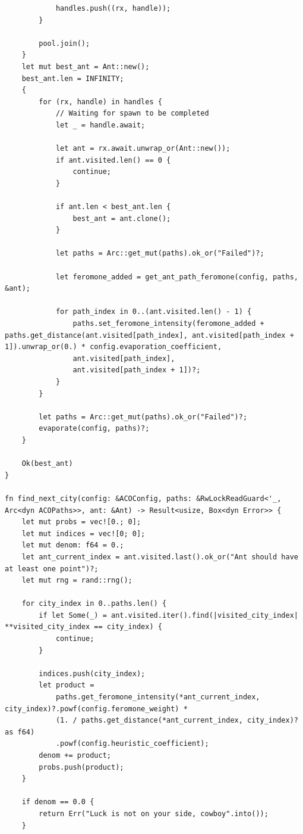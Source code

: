 \documentclass[a4paper,14pt]{extarticle}
\begin{document}
\begin{verbatim}
            handles.push((rx, handle));
        }

        pool.join();
    }
    let mut best_ant = Ant::new();
    best_ant.len = INFINITY;
    {
        for (rx, handle) in handles {
            // Waiting for spawn to be completed
            let _ = handle.await;

            let ant = rx.await.unwrap_or(Ant::new());
            if ant.visited.len() == 0 {
                continue;
            }

            if ant.len < best_ant.len {
                best_ant = ant.clone();
            }
            
            let paths = Arc::get_mut(paths).ok_or("Failed")?;

            let feromone_added = get_ant_path_feromone(config, paths, &ant);

            for path_index in 0..(ant.visited.len() - 1) {
                paths.set_feromone_intensity(feromone_added + paths.get_distance(ant.visited[path_index], ant.visited[path_index + 1]).unwrap_or(0.) * config.evaporation_coefficient, 
                ant.visited[path_index], 
                ant.visited[path_index + 1])?;
            }
        }

        let paths = Arc::get_mut(paths).ok_or("Failed")?;
        evaporate(config, paths)?;
    }

    Ok(best_ant)
}

fn find_next_city(config: &ACOConfig, paths: &RwLockReadGuard<'_, Arc<dyn ACOPaths>>, ant: &Ant) -> Result<usize, Box<dyn Error>> {
    let mut probs = vec![0.; 0];
    let mut indices = vec![0; 0];
    let mut denom: f64 = 0.;
    let ant_current_index = ant.visited.last().ok_or("Ant should have at least one point")?;
    let mut rng = rand::rng();

    for city_index in 0..paths.len() {
        if let Some(_) = ant.visited.iter().find(|visited_city_index| **visited_city_index == city_index) {
            continue;
        }

        indices.push(city_index);
        let product = 
            paths.get_feromone_intensity(*ant_current_index, city_index)?.powf(config.feromone_weight) * 
            (1. / paths.get_distance(*ant_current_index, city_index)? as f64)
            .powf(config.heuristic_coefficient);
        denom += product;
        probs.push(product);
    }

    if denom == 0.0 {
        return Err("Luck is not on your side, cowboy".into());
    }


\end{verbatim}
\end{document}
